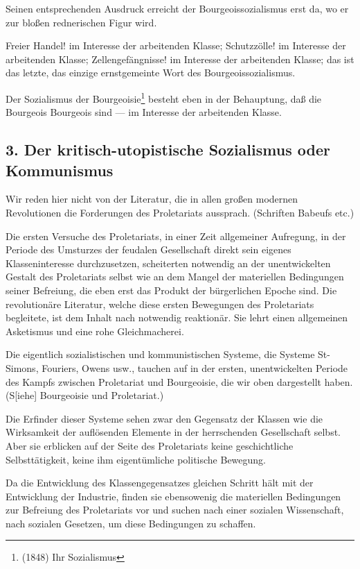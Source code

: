 \documentclass[letterpaper]{article}
\begin{document}
Seinen entsprechenden Ausdruck erreicht der Bourgeoissozialismus erst da, wo er zur bloßen rednerischen Figur wird.

Freier Handel! im Interesse der arbeitenden Klasse; Schutzzölle! im Interesse der arbeitenden Klasse; Zellengefängnisse! im Interesse der arbeitenden Klasse; das ist das letzte, das einzige ernstgemeinte Wort des Bourgeoissozialismus.

Der Sozialismus der Bourgeoisie\footnote{(1848) Ihr Sozialismus} besteht eben in der Behauptung, daß die Bourgeois Bourgeois sind — im Interesse der arbeitenden Klasse.

\subsection{3. Der kritisch-utopistische Sozialismus oder Kommunismus}

Wir reden hier nicht von der Literatur, die in allen großen modernen Revolutionen die Forderungen des Proletariats aussprach. (Schriften Babeufs etc.)

Die ersten Versuche des Proletariats, in einer Zeit allgemeiner Aufregung, in der Periode des Umsturzes der feudalen Gesellschaft direkt sein eigenes Klasseninteresse durchzusetzen, scheiterten notwendig an der unentwickelten Gestalt des Proletariats selbst wie an dem Mangel der materiellen Bedingungen seiner Befreiung, die eben erst das Produkt der bürgerlichen Epoche sind. Die revolutionäre Literatur, welche diese ersten Bewegungen des Proletariats begleitete, ist dem Inhalt nach notwendig reaktionär. Sie lehrt einen allgemeinen Asketismus und eine rohe Gleichmacherei.

Die eigentlich sozialistischen und kommunistischen Systeme, die Systeme St-Simons, Fouriers, Owens usw., tauchen auf in der ersten, unentwickelten Periode des Kampfs zwischen Proletariat und Bourgeoisie, die wir oben dargestellt haben. (S[iehe] Bourgeoisie und Proletariat.)

Die Erfinder dieser Systeme sehen zwar den Gegensatz der Klassen wie die Wirksamkeit der auflösenden Elemente in der herrschenden Gesellschaft selbst. Aber sie erblicken auf der Seite des Proletariats keine geschichtliche Selbsttätigkeit, keine ihm eigentümliche politische Bewegung.

Da die Entwicklung des Klassengegensatzes gleichen Schritt hält mit der Entwicklung der Industrie, finden sie ebensowenig die materiellen Bedingungen zur Befreiung des Proletariats vor und suchen nach einer sozialen Wissenschaft, nach sozialen Gesetzen, um diese Bedingungen zu schaffen.
\end{document}
